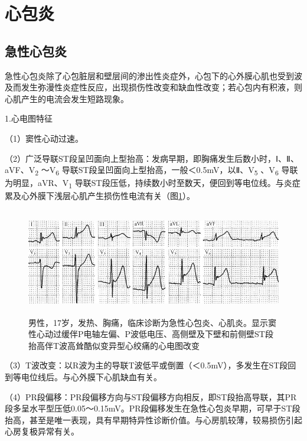 \protect\hypertarget{text00050.htmlux5cux23subid610}{}{}

\section{心包炎}

\protect\hypertarget{text00050.htmlux5cux23subid611}{}{}

\subsection{急性心包炎}

急性心包炎除了心包脏层和壁层间的渗出性炎症外，心包下的心外膜心肌也受到波及而发生弥漫性炎症性反应，出现损伤性改变和缺血性改变；若心包内有积液，则心肌产生的电流会发生短路现象。

1.心电图特征

（1）窦性心动过速。

（2）广泛导联ST段呈凹面向上型抬高：发病早期，即胸痛发生后数小时，Ⅰ、Ⅱ、aVF、V\textsubscript{2}
～V\textsubscript{6}
导联ST段呈凹面向上型抬高，一般＜0.5mV，以Ⅱ、V\textsubscript{5}
、V\textsubscript{6} 导联为明显，aVR、V\textsubscript{1}
导联ST段压低，持续数小时至数天，便回到等电位线。与炎症累及心外膜下浅层心肌产生损伤性电流有关（图\ref{fig42-9}）。

\begin{figure}[!htbp]
 \centering
 \includegraphics[width=5.58333in,height=1.83333in]{./images/Image00700.jpg}
 \captionsetup{justification=centering}
 \caption{男性，17岁，发热、胸痛，临床诊断为急性心包炎、心肌炎。显示窦性心动过缓伴P电轴左偏、P波低电压、高侧壁及下壁和前侧壁ST段抬高伴T波高耸酷似变异型心绞痛的心电图改变}
 \label{fig42-9}
  \end{figure} 

（3）T波改变：以R波为主的导联T波低平或倒置（＜0.5mV），多发生在ST段回到等电位线后。与心外膜下心肌缺血有关。

（4）PR段偏移：PR段偏移方向与ST段偏移方向相反，即ST段抬高导联，其PR段多呈水平型压低0.05～0.15mV。PR段偏移发生在急性心包炎早期，可早于ST段抬高，甚至是唯一表现，具有早期特异性诊断价值。与心房肌较薄，较易损伤引起心房复极异常有关。

